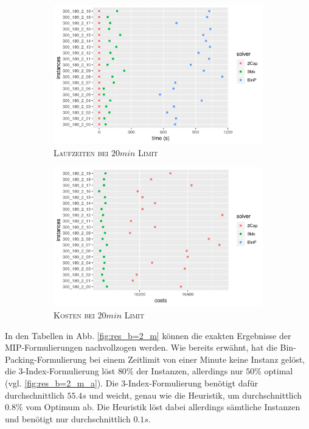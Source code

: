 \begin{figure}[H]
\centering
\begin{subfigure}[b]{0.4\textwidth}
\centering
\includegraphics[width=1.3\textwidth]{img/solver_instance_time_b=2_m_1200s.png}
\caption{\textsc{Laufzeiten bei $20min$ Limit}}
\label{fig:b=2_m_runtimes}
\end{subfigure}
\hfill
\begin{subfigure}[b]{0.4\textwidth}
\centering
\includegraphics[width=1.3\textwidth]{img/solver_instance_cost_b=2_m_1200s.png}
\caption{\textsc{Kosten bei $20min$ Limit}}
\label{fig:b=2_m_costs}
\end{subfigure}
\caption{}
\label{fig:res_plots_b=2_m}
\end{figure}

In den Tabellen in Abb. \ref{fig:res_b=2_m} können die exakten Ergebnisse der MIP-Formulierungen nachvollzogen werden.
Wie bereits erwähnt, hat die Bin-Packing-Formulierung bei einem Zeitlimit von einer Minute keine Instanz gelöst, die 3-Index-Formulierung löst
$80 \%$ der Instanzen, allerdings nur $50 \%$ optimal (vgl. \ref{fig:res_b=2_m_a}). Die 3-Index-Formulierung benötigt dafür durchschnittlich
$55.4s$ und weicht, genau wie die Heuristik, um durchschnittlich $0.8 \%$ vom Optimum ab. Die Heuristik löst dabei allerdings sämtliche Instanzen
und benötigt nur durchschnittlich $0.1s$.


